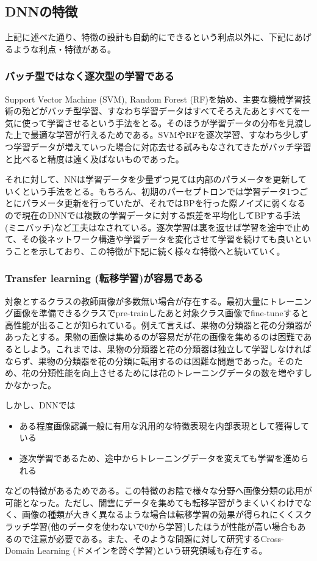 \subsection{DNNの特徴}
上記に述べた通り、特徴の設計も自動的にできるという利点以外に、下記にあげるような利点・特徴がある。

\subsubsection{バッチ型ではなく逐次型の学習である}
Support Vector Machine (SVM), Random Forest (RF)を始め、主要な機械学習技術の殆どがバッチ型学習、すなわち学習データはすべてそろえたあとすべてを一気に使って学習させるという手法をとる。そのほうが学習データの分布を見渡した上で最適な学習が行えるためである。SVMやRFを逐次学習、すなわち少しずつ学習データが増えていった場合に対応去せる試みもなされてきたがバッチ学習と比べると精度は遠く及ばないものであった。

それに対して、NNは学習データを少量ずつ見ては内部のパラメータを更新していくという手法をとる。もちろん、初期のパーセプトロンでは学習データ1つごとにパラメータ更新を行っていたが、それではBPを行った際ノイズに弱くなるので現在のDNNでは複数の学習データに対する誤差を平均化してBPする手法(ミニバッチ)など工夫はなされている。逐次学習は裏を返せば学習を途中で止めて、その後ネットワーク構造や学習データを変化させて学習を続けても良いということを示しており、この特徴が下記に続く様々な特徴へと続いていく。


\subsubsection{Transfer learning (転移学習)が容易である}
対象とするクラスの教師画像が多数無い場合が存在する。最初大量にトレーニング画像を準備できるクラスでpre-trainしたあと対象クラス画像でfine-tuneすると高性能が出ることが知られている。例えて言えば、果物の分類器と花の分類器があったとする。果物の画像は集めるのが容易だが花の画像を集めるのは困難であるとしよう。これまでは、果物の分類器と花の分類器は独立して学習しなければならず、果物の分類器を花の分類に転用するのは困難な問題であった。そのため、花の分類性能を向上させるためには花のトレーニングデータの数を増やすしかなかった。

しかし、DNNでは
\begin{itemize}
\item ある程度画像認識一般に有用な汎用的な特徴表現を内部表現として獲得している
\item 逐次学習であるため、途中からトレーニングデータを変えても学習を進められる
\end{itemize}
などの特徴があるためである。この特徴のお陰で様々な分野へ画像分類の応用が可能となった。ただし、闇雲にデータを集めても転移学習がうまくいくわけでなく、画像の種類が大きく異なるような場合は転移学習の効果が得られにくくスクラッチ学習(他のデータを使わないで0から学習)したほうが性能が高い場合もあるので注意が必要である。また、そのような問題に対して研究するCross-Domain Learning (ドメインを跨ぐ学習)という研究領域も存在する。



